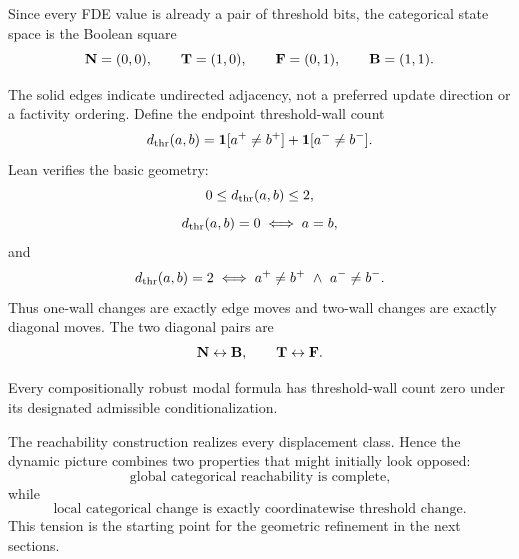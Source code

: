 Since every FDE value is already a pair of threshold bits, the categorical state space is the Boolean square
\[
  \mathbf{N}=(0,0),\qquad
  \mathbf{T}=(1,0),\qquad
  \mathbf{F}=(0,1),\qquad
  \mathbf{B}=(1,1).
\]

\begin{center}
\end{center}

The solid edges indicate undirected adjacency, not a preferred update direction or a factivity ordering. Define the endpoint threshold-wall count
\[
  d_{\mathrm{thr}}(a,b)
  =\mathbf{1}[a^+\neq b^+]
   +\mathbf{1}[a^-\neq b^-].
\]
Lean verifies the basic geometry:
\[
  0\le d_{\mathrm{thr}}(a,b)\le 2,
\]
\[
  d_{\mathrm{thr}}(a,b)=0\iff a=b,
\]
and
\[
  d_{\mathrm{thr}}(a,b)=2
  \iff
  a^+\neq b^+\ \land\ a^-\neq b^-.
\]
Thus one-wall changes are exactly edge moves and two-wall changes are exactly diagonal moves. The two diagonal pairs are
\[
  \mathbf{N}\leftrightarrow\mathbf{B},
  \qquad
  \mathbf{T}\leftrightarrow\mathbf{F}.
\]

\begin{proposition}
Every compositionally robust modal formula has threshold-wall count zero under its designated admissible conditionalization.
\statusverified
\end{proposition}

The reachability construction realizes every displacement class. Hence the dynamic picture combines two properties that might initially look opposed:
\[
  \text{global categorical reachability is complete,}
\]
while
\[
  \text{local categorical change is exactly coordinatewise threshold change.}
\]
This tension is the starting point for the geometric refinement in the next sections.
